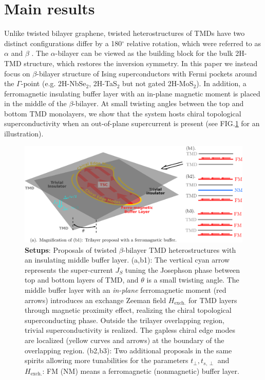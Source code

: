 \section{Main results}
Unlike twisted bilayer graphene, twisted heterostructures of TMDs have two distinct configurations differ by a 180$^\circ$ relative rotation, which were referred to as $\alpha$ and $\beta$  \cite{xian2019multiflat}. The $\alpha$-bilayer can be viewed as the building block for the bulk 2H-TMD structure, which restores the inversion symmetry. In this paper we instead focus on $\beta$-bilayer structure of Ising superconductors with Fermi pockets around the $\Gamma$-point (e.g. 2H-NbSe$_2$, 2H-TaS$_2$ but not gated 2H-MoS$_2$). In addition, a ferromagnetic insulating buffer layer with an in-plane magnetic moment is placed in the middle of the $\beta$-bilayer. At small twisting angles between the top and bottom TMD monolayers, we show that the system hosts chiral topological superconductivity when an out-of-plane supercurrent is present (see FIG.\ref{fig: proposals} for an illustration).
\begin{figure} 
    \centering
    \includegraphics[width=1.0\textwidth]{contents/Ising_Top/figures/Magnetic Buffer Layer.combo.eps}
    \caption{{\bf Setups}: Proposals of twisted $\beta$-bilayer TMD heterostructures with an insulating middle buffer layer. (a,b1): The vertical cyan arrow represents the super-current $J_S$ tuning the Josephson phase between top and bottom layers of TMD, and $\theta$ is a small twisting angle. The middle buffer layer with an \emph{in-plane} ferromagnetic moment (red arrows)  introduces an exchange Zeeman field $H_{\text{exch.}}$ for TMD layers through magnetic proximity effect, realizing the chiral topological superconducting phase. Outside the trilayer overlapping region, trivial superconductivity is realized. The gapless chiral edge modes are localized (yellow curves and arrows) at the boundary of the overlapping region. (b2,b3): Two additional proposals in the same spirits allowing more tunabilities for the parameters $t_\perp,t_{s,\perp}$ and $H_{\text{exch.}}$: FM (NM) means a ferromagnetic (nonmagnetic) buffer layer.}
    \label{fig: proposals}
\end{figure}

